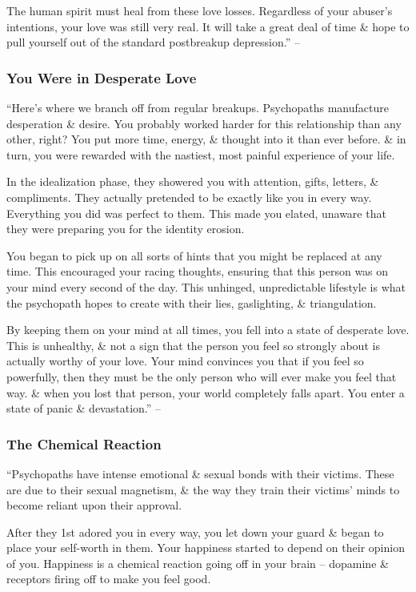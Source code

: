 \documentclass{article}
\numberwithin{equation}{section}
\begin{document}
The human spirit must heal from these love losses. Regardless of your abuser's intentions, your love was still very real. It will take a great deal of time \& hope to pull yourself out of the standard postbreakup depression.'' -- \cite[p. 88]{MacKenzie2015}

\subsubsection{You Were in Desperate Love}
``Here's where we branch off from regular breakups. Psychopaths manufacture desperation \& desire. You probably worked harder for this relationship than any other, right? You put more time, energy, \& thought into it than ever before. \& in turn, you were rewarded with the nastiest, most painful experience of your life.

In the idealization phase, they showered you with attention, gifts, letters, \& compliments. They actually pretended to be exactly like you in every way. Everything you did was perfect to them. This made you elated, unaware that they were preparing you for the identity erosion.

You began to pick up on all sorts of hints that you might be replaced at any time. This encouraged your racing thoughts, ensuring that this person was on your mind every second of the day. This unhinged, unpredictable lifestyle is what the psychopath hopes to create with their lies, gaslighting, \& triangulation.

By keeping them on your mind at all times, you fell into a state of desperate love. This is unhealthy, \& not a sign that the person you feel so strongly about is actually worthy of your love. Your mind convinces you that if you feel so powerfully, then they must be the only person who will ever make you feel that way. \& when you lost that person, your world completely falls apart. You enter a state of panic \& devastation.'' -- \cite[pp. 88--89]{MacKenzie2015}

\subsubsection{The Chemical Reaction}
``Psychopaths have intense emotional \& sexual bonds with their victims. These are due to their sexual magnetism, \& the way they train their victims' minds to become reliant upon their approval.

After they 1st adored you in every way, you let down your guard \& began to place your self-worth in them. Your happiness started to depend on their opinion of you. Happiness is a chemical reaction going off in your brain -- dopamine \& receptors firing off to make you feel good.
\end{document}
